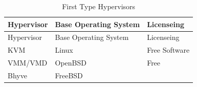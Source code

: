 \documentclass[
  14pt,
  english,
  a4paper,
]{scrreprt}
\begin{document}
\hypertarget{tbl:type1_hyp}{}
\begin{longtable}[]{@{}lll@{}}
\caption{\label{tbl:type1_hyp}First Type Hypervisors}\tabularnewline
\toprule
\begin{minipage}[b]{0.25\columnwidth}\raggedright
Hypervisor\strut
\end{minipage} & \begin{minipage}[b]{0.30\columnwidth}\raggedright
Base Operating System\strut
\end{minipage} & \begin{minipage}[b]{0.22\columnwidth}\raggedright
Licenseing\strut
\end{minipage}\tabularnewline
\midrule
\endfirsthead
\toprule
\begin{minipage}[b]{0.25\columnwidth}\raggedright
Hypervisor\strut
\end{minipage} & \begin{minipage}[b]{0.30\columnwidth}\raggedright
Base Operating System\strut
\end{minipage} & \begin{minipage}[b]{0.22\columnwidth}\raggedright
Licenseing\strut
\end{minipage}\tabularnewline
\midrule
\endhead
\begin{minipage}[t]{0.25\columnwidth}\raggedright
KVM\strut
\end{minipage} & \begin{minipage}[t]{0.30\columnwidth}\raggedright
Linux\strut
\end{minipage} & \begin{minipage}[t]{0.22\columnwidth}\raggedright
Free Software\strut
\end{minipage}\tabularnewline
\begin{minipage}[t]{0.25\columnwidth}\raggedright
VMM/VMD\strut
\end{minipage} & \begin{minipage}[t]{0.30\columnwidth}\raggedright
OpenBSD\strut
\end{minipage} & \begin{minipage}[t]{0.22\columnwidth}\raggedright
Free\strut
\end{minipage}\tabularnewline
\begin{minipage}[t]{0.25\columnwidth}\raggedright
Bhyve\strut
\end{minipage} & \begin{minipage}[t]{0.30\columnwidth}\raggedright
FreeBSD\strut
\end{minipage} & \begin{minipage}[t]{0.22\columnwidth}\raggedright

\end{minipage}
\end{longtable}
\end{document}
